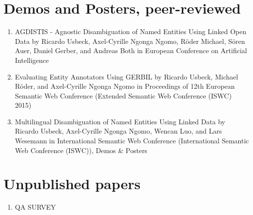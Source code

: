 \section*{Demos and Posters, peer-reviewed}
\begin{enumerate}[resume]
    \item AGDISTIS - Agnostic Disambiguation of Named Entities Using Linked Open Data by Ricardo Usbeck, Axel-Cyrille Ngonga Ngomo, Röder Michael, Sören Auer, Daniel Gerber, and Andreas Both in European Conference on Artificial Intelligence 
    \item Evaluating Entity Annotators Using GERBIL by Ricardo Usbeck, Michael Röder, and Axel-Cyrille Ngonga Ngomo in Proceedings of 12th European Semantic Web Conference (Extended Semantic Web Conference (ISWC) 2015) 
    \item Multilingual Disambiguation of Named Entities Using Linked Data by Ricardo Usbeck, Axel-Cyrille Ngonga Ngomo, Wencan Luo, and Lars Wesemann in International Semantic Web Conference (International Semantic Web Conference (ISWC)), Demos \& Posters 
\end{enumerate}

\section*{Unpublished papers}
\begin{enumerate}[resume]
\item QA SURVEY
\end{enumerate}

